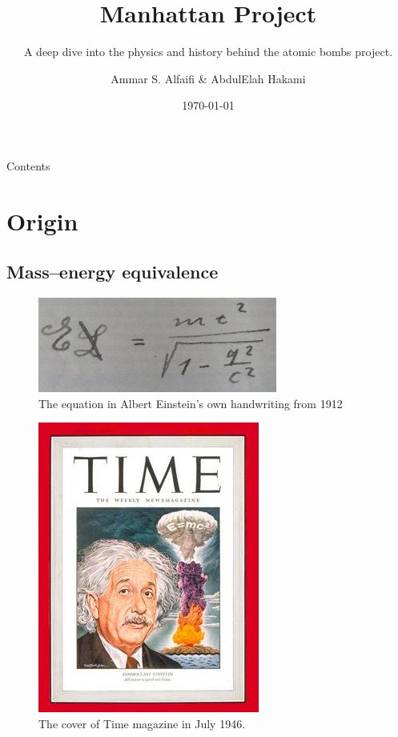 \documentclass{loyola-beamer}
\title{Manhattan Project}
\subtitle{A deep dive into the physics and history behind the atomic bombs project.}
\author{Ammar S. Alfaifi \& AbdulElah Hakami}
\date{\today}
\institute{NTiS}
\begin{document}
\begin{titleframe}{}
	\maketitle
\end{titleframe}

\begin{frame}{Contents}
	\tableofcontents
\end{frame}

\section{Origin}

\subsection{Mass–energy equivalence}

\begin{frame}
	\begin{figure}
		\begin{center}
			\includegraphics[width=0.7\textwidth]{./figures/E_mc_2.jpg}
		\end{center}
		\caption{The equation in Albert Einstein's own handwriting from 1912}\label{fig:e is mc2}
	\end{figure}
\end{frame}

\begin{frame}
	\begin{figure}
		\begin{center}
			\includegraphics[height=0.5\textwidth]{./figures/Einstein_-_Time_Magazine.jpg}
		\end{center}
		\caption{The cover of Time magazine in July 1946.}\label{fig:The Time}
	\end{figure}
\end{frame}
\end{document}
